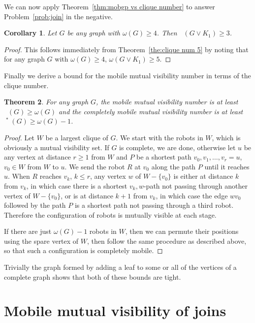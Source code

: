 \documentclass[a4paper,12pt]{article}
\DeclareMathOperator{\mob}{Mob_{gp}}
\DeclareMathOperator{\mobmv}{Mob_{\mu}}
\newtheorem{theorem}{Theorem}[section]
\newtheorem{corollary}[theorem]{Corollary}
\theoremstyle{definition}
\begin{document}
	We can now apply Theorem~\ref{thm:mobgp vs clique number} to answer Problem~\ref{prob:join} in the negative.
	
	\begin{corollary}
		Let $G$ be any graph with $\omega(G) \geq 4$. Then $\mob(G \vee K_1) \geq 3$.
	\end{corollary}
	\begin{proof}
		This follows immediately from Theorem~\ref{the:clique num 5} by noting that for any graph $G$ with $\omega(G) \geq 4$, $\omega(G \vee K_1) \geq 5$.
	\end{proof}
	
	Finally we derive a bound for the mobile mutual visibility number in terms of the clique number.
	
	
	\begin{theorem}\label{thm:cliquevsmobmvnum}
		For any graph $G$, the mobile mutual visibility number is at least $ \mobmv (G) \geq \omega (G)$ and the completely mobile mutual visibility number is at least $\mobmv ^*(G) \geq \omega (G)-1$.
	\end{theorem}
	\begin{proof}
		Let $W$ be a largest clique of $G$. We start with the robots in $W$, which is obviously a mutual visibility set. If $G$ is complete, we are done, otherwise let $u$ be any vertex at distance $r \geq 1$ from $W$ and $P$ be a shortest path $v_0,v_1,\dots ,v_r=u$, $v_0 \in W$ from $W$ to $u$. We send the robot $R$ at $v_0$ along the path $P$ until it reaches $u$. When $R$ reaches $v_k$, $k \leq r$, any vertex $w$ of $W-\{ v_0\} $ is either at distance $k$ from $v_k$, in which case there is a shortest $v_k,w$-path not passing through another vertex of $W-\{v_0\} $, or is at distance $k+1$ from $v_k$, in which case the edge $wv_0$ followed by the path $P$ is a shortest path not passing through a third robot. Therefore the configuration of robots is mutually visible at each stage. 
		
		If there are just $\omega (G)-1$ robots in $W$, then we can permute their positions using the spare vertex of $W$, then follow the same procedure as described above, so that such a configuration is completely mobile.
	\end{proof}
	
	Trivially the graph formed by adding a leaf to some or all of the vertices of a complete graph shows that both of these bounds are tight. 
	
	
	
	
	\section{Mobile mutual visibility of joins}\label{sec:join}
	
\end{document}

